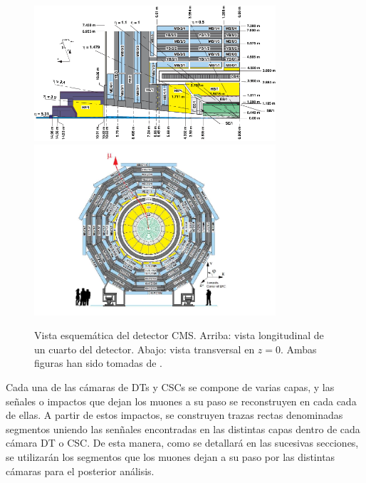 \begin{figure}
\centering
\includegraphics[width=0.8\textwidth]{figures/CMSview1.png}
\includegraphics[width=0.8\textwidth]{figures/CMSview.png}
\caption{Vista esquem\'atica del detector CMS. Arriba: vista longitudinal de un cuarto del detector. Abajo: vista transversal en $z = 0$. Ambas figuras han sido tomadas de \cite{DTperformance}.}
\label{fig:CMSsub}
\end{figure}


Cada una de las c\'amaras de DTs y CSCs se compone de varias capas, y las se\~nales o impactos que dejan los muones a su paso se reconstruyen en cada cada de ellas. A partir de estos impactos, se construyen trazas rectas denominadas segmentos uniendo las sen\~nales encontradas en las distintas capas dentro de cada c\'amara DT o CSC. De esta manera, como se detallar\'a en las sucesivas secciones, se utilizar\'an los segmentos que los muones dejan a su paso por las distintas c\'amaras para el posterior an\'alisis.
